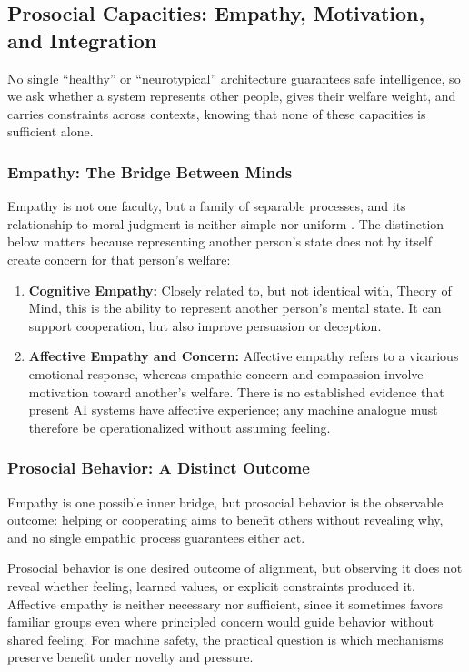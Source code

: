 \documentclass{article}
\begin{document}
\subsection{Prosocial Capacities: Empathy, Motivation, and Integration}
No single ``healthy'' or ``neurotypical'' architecture guarantees safe intelligence, so we ask whether a system represents other people, gives their welfare weight, and carries constraints across contexts, knowing that none of these capacities is sufficient alone.
\subsubsection{Empathy: The Bridge Between Minds}
Empathy is not one faculty, but a family of separable processes, and its relationship to moral judgment is neither simple nor uniform \citep{ref70}. The distinction below matters because representing another person's state does not by itself create concern for that person's welfare:
\begin{enumerate}
    \item \textbf{Cognitive Empathy:} Closely related to, but not identical with, Theory of Mind, this is the ability to represent another person's mental state. It can support cooperation, but also improve persuasion or deception.
    \item \textbf{Affective Empathy and Concern:} Affective empathy refers to a vicarious emotional response, whereas empathic concern and compassion involve motivation toward another's welfare. There is no established evidence that present AI systems have affective experience; any machine analogue must therefore be operationalized without assuming feeling.
\end{enumerate}
\subsubsection{Prosocial Behavior: A Distinct Outcome}
Empathy is one possible inner bridge, but prosocial behavior is the observable outcome: helping or cooperating aims to benefit others without revealing why, and no single empathic process guarantees either act.

Prosocial behavior is one desired outcome of alignment, but observing it does not reveal whether feeling, learned values, or explicit constraints produced it. Affective empathy is neither necessary nor sufficient, since it sometimes favors familiar groups even where principled concern would guide behavior without shared feeling. For machine safety, the practical question is which mechanisms preserve benefit under novelty and pressure.
\end{document}
